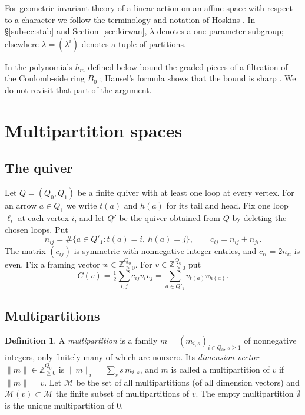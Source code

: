 \documentclass[11pt]{amsart}
\theoremstyle{definition}
\newtheorem{definition}[theorem]{Definition}
\theoremstyle{remark}
\numberwithin{equation}{section}
\newcommand{\Z}{\mathbb{Z}}
\newcommand{\cM}{\mathcal{M}}
\newcommand{\norm}[1]{\lVert #1\rVert}
\begin{document}
For geometric invariant theory of a linear action on an affine space with respect to a character we
follow the terminology and notation of Hoskins \cite[\S2]{Hos}. In \S\ref{subsec:stab} and
Section~\ref{sec:kirwan}, $\lambda$ denotes a one-parameter subgroup; elsewhere $\lambda=(\lambda^i)$
denotes a tuple of partitions.

In \cite{Hik} the polynomials $h_m$ defined below bound the graded pieces of a filtration of the
Coulomb-side ring $B_0$ \cite[Proposition~5.2]{Hik}; Hausel's formula shows that the bound is sharp
\cite[Proposition~6.4, Corollary~6.6]{Hik}. We do not revisit that part of the argument.

\section{Multipartition spaces}\label{sec:defs}

\subsection{The quiver}\label{subsec:quiver}
Let $Q=(Q_0,Q_1)$ be a finite quiver with at least one loop at every vertex. For an arrow $a\in Q_1$ we
write $t(a)$ and $h(a)$ for its tail and head. Fix one loop $\ell_i$ at each vertex $i$, and let $Q'$ be
the quiver obtained from $Q$ by deleting the chosen loops. Put
\begin{equation}\label{eq:cij}
  n_{ij}=\#\{a\in Q'_1: t(a)=i,\ h(a)=j\},\qquad c_{ij}=n_{ij}+n_{ji}.
\end{equation}
The matrix $(c_{ij})$ is symmetric with nonnegative integer entries, and $c_{ii}=2n_{ii}$ is even.
Fix a framing vector $w\in\Z_{\ge 0}^{Q_0}$. For $v\in\Z_{\ge0}^{Q_0}$ put
\begin{equation}\label{eq:Cv}
  C(v)=\tfrac12\sum_{i,j}c_{ij}v_iv_j=\sum_{a\in Q'_1}v_{t(a)}v_{h(a)}.
\end{equation}

\subsection{Multipartitions}\label{subsec:multipartitions}

\begin{definition}\label{def:multipartition}
A \emph{multipartition} is a family $m=(m_{i,s})_{i\in Q_0,\,s\ge1}$ of nonnegative integers, only
finitely many of which are nonzero. Its \emph{dimension vector} $\norm{m}\in\Z_{\ge0}^{Q_0}$ is
$\norm{m}_i=\sum_{s}s\,m_{i,s}$, and $m$ is called a multipartition of $v$ if $\norm{m}=v$. Let $\cM$ be
the set of all multipartitions (of all dimension vectors) and $\cM(v)\subset\cM$ the finite subset of
multipartitions of $v$. The empty multipartition $\emptyset$ is the unique multipartition of $0$.
\end{definition}
\end{document}
